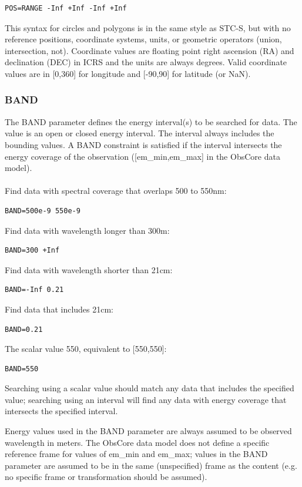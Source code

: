 \documentclass[11pt,a4paper]{ivoa}
\begin{document}
\begin{lstlisting}
POS=RANGE -Inf +Inf -Inf +Inf
\end{lstlisting}


This syntax for circles and polygons is in the same style as STC-S, but with no reference positions, coordinate systems, units, or geometric operators (union, intersection, not). Coordinate values are floating point right ascension (RA) and declination (DEC) in ICRS and the units are always degrees. Valid coordinate values are in [0,360] for longitude and [-90,90] for latitude (or NaN).

\subsubsection{BAND}
\label{sec:BAND}

The BAND parameter defines the energy interval(s) to be searched for data. The value is an open or closed energy interval. The interval always includes the bounding values. A BAND constraint is satisfied if the interval intersects the energy coverage of the observation ([em\_min,em\_max] in the ObsCore data model). \\ \\
Find data with spectral coverage that overlaps 500 to 550nm:

\begin{lstlisting}
BAND=500e-9 550e-9
\end{lstlisting}
Find data with wavelength longer than 300m:
\begin{lstlisting}
BAND=300 +Inf
\end{lstlisting}
Find data with wavelength shorter than 21cm:
\begin{lstlisting}
BAND=-Inf 0.21
\end{lstlisting}
Find data that includes 21cm:
\begin{lstlisting}
BAND=0.21
\end{lstlisting}
The scalar value 550, equivalent to [550,550]:
\begin{lstlisting}
BAND=550
\end{lstlisting}


Searching using a scalar value should match any data that includes the specified value; searching using an interval will find any data with energy coverage that intersects the specified interval.

Energy values used in the BAND parameter are always assumed to be  observed wavelength in meters. The ObsCore data model does not define a specific reference frame for values of em\_min and em\_max; values in the BAND parameter are assumed to be in the same (unspecified) frame as the content (e.g. no specific frame or transformation should be assumed). 
\end{document}
